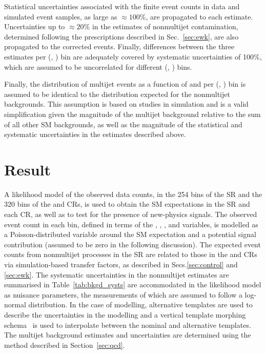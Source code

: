 Statistical uncertainties associated with the finite event counts in
data and simulated event samples, as large as ${\approx}100\%$, are
propagated to each estimate. Uncertainties up to ${\approx}20\%$ in
the estimates of nonmultijet contamination, determined following the
prescriptions described in Sec.~\ref{sec:ewk}, are also propagated to
the corrected events. Finally, differences between the three estimates
per (\njet, \scalht) bin are adequately covered by systematic
uncertainties of 100\%, which are assumed to be uncorrelated for
different (\njet, \scalht) bins.

Finally, the distribution of multijet events as a function of \nb and
\mht per (\njet, \scalht) bin is assumed to be identical to the
distribution expected for the nonmultijet backgrounds. This assumption
is based on studies in simulation %
and is a valid simplification given the magnitude of the multijet
background relative to the sum of all other SM backgrounds, as well as
the magnitude of the statistical and systematic uncertainties in the
estimates described above.


\section{Result}
\label{sec:result}

A likelihood model of the observed data counts, in the 254 bins of the
SR and the 320 bins of the \mj and \mmj CRs, is used to obtain the SM
expectations in the SR and each CR, as well as to test for the
presence of new-physics signals. The observed event count in each bin,
defined in terms of the \njet, \nb, \scalht, and \mht variables, is
modelled as a Poisson-distributed variable around the SM expectation
and a potential signal contribution (assumed to be zero in the
following discussion). The expected event counts from nonmultijet
processes in the SR are related to those in the \mj and \mmj CRs via
simulation-based transfer factors, as described in
Secs.\ref{sec:control} and \ref{sec:ewk}. The systematic uncertainties
in the nonmultijet estimates are summarised in
Table~\ref{tab:bkgd_systs} are accommodated in the likelihood model as
nuisance parameters, the measurements of which are assumed to follow a
log-normal distribution. In the case of \mht modelling, alternative
templates are used to describe the uncertainties in the \mht modelling
and a vertical template morphing schema~\cite{Prosper:2011zz,
  Khachatryan:2016dvc} is used to interpolate between the nominal and
alternative templates. The multijet background estimates and
uncertainties are determined using the method described in
Section~\ref{sec:qcd}.


